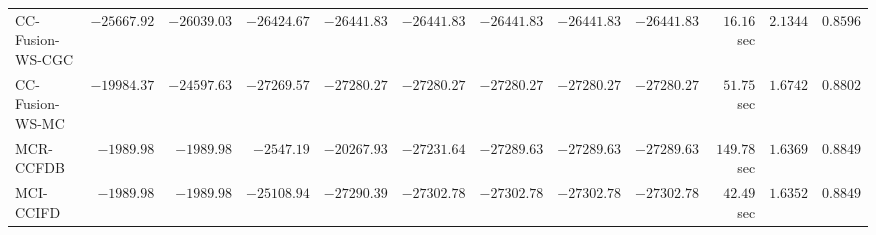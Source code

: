 \begin{table}[H]
\begin{tabular}{lrrrrrrrrrrr}
    CC-Fusion-WS-CGC & $    -25667.92$ & $    -26039.03$ & $    -26424.67$ & $    -26441.83$ & $    -26441.83$ & $    -26441.83$ & $    -26441.83$ & $    -26441.83$ & $        16.16$ sec    & $       2.1344$  & $       0.8596$ \\ 
     CC-Fusion-WS-MC & $    -19984.37$ & $    -24597.63$ & $    -27269.57$ & $    -27280.27$ & $    -27280.27$ & $    -27280.27$ & $    -27280.27$ & $    -27280.27$ & $        51.75$ sec    & $       1.6742$  & $       0.8802$ \\ 
\cmidrule{1-1} 
           MCR-CCFDB & $     -1989.98$ & $     -1989.98$ & $     -2547.19$ & $    -20267.93$ & $    -27231.64$ & $    -27289.63$ & $    -27289.63$ & $    -27289.63$ & $       149.78$ sec    & $       1.6369$  & $       0.8849$ \\ 
\cmidrule{1-1} 
           MCI-CCIFD & $     -1989.98$ & $     -1989.98$ & $    -25108.94$ & $    -27290.39$ & $    -27302.78$ & $    -27302.78$ & $    -27302.78$ & $    -27302.78$ & $        42.49$ sec    & $       1.6352$  & $       0.8849$ \\ 
\bottomrule
\end{tabular}
\end{table}